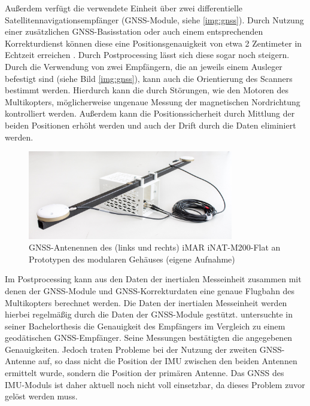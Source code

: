 \documentclass[a4paper,12pt,bibliography=totoc, listof=totoc,titlepage,pointlessnumbers]{scrreprt}
\begin{document}
Außerdem verfügt die verwendete Einheit über zwei differentielle Satellitennavigationsempfänger (GNSS-Module, siehe \autoref{img:gnss}). Durch Nutzung einer zusätzlichen GNSS-Basisstation oder auch einem entsprechenden Korrekturdienst können diese eine Positionsgenauigkeit von etwa 2 Zentimeter in Echtzeit erreichen \citep{imar}. Durch Postprocessing lässt sich diese sogar noch steigern. Durch die Verwendung von zwei Empfängern, die an jeweils einem Ausleger befestigt sind (siehe Bild \autoref{img:gnss}), kann auch die Orientierung des Scanners bestimmt werden. Hierdurch kann die durch Störungen, wie den Motoren des Multikopters, möglicherweise ungenaue Messung der magnetischen Nordrichtung kontrolliert werden. Außerdem kann die Positionssicherheit durch Mittlung der beiden Positionen erhöht werden und auch der Drift durch die Daten eliminiert werden.

\begin{figure}[!ht]
 \centering
 \includegraphics[width=0.8\textwidth]{./img/gnss.jpg}
 \caption{GNSS-Antenennen des (links und rechts) iMAR iNAT-M200-Flat an Prototypen des modularen Gehäuses (eigene Aufnahme)}
 \label{img:gnss}
\end{figure}

Im Postprocessing kann aus den Daten der inertialen Messeinheit zusammen mit denen der GNSS-Module und GNSS-Korrekturdaten eine genaue Flugbahn des Multikopters berechnet werden. Die Daten der inertialen Messeinheit werden hierbei regelmäßig durch die Daten der GNSS-Module gestützt.
\citet{wilken} untersuchte in seiner Bachelorthesis die Genauigkeit des Empfängers im Vergleich zu einem geodätischen GNSS-Empfänger. Seine Messungen bestätigten die angegebenen Genauigkeiten. Jedoch traten Probleme bei der Nutzung der zweiten GNSS-Antenne auf, so dass nicht die Position der IMU zwischen den beiden Antennen ermittelt wurde, sondern die Position der primären Antenne. Das GNSS des IMU-Moduls ist daher aktuell noch nicht voll einsetzbar, da dieses Problem zuvor gelöst werden muss.
\end{document}
